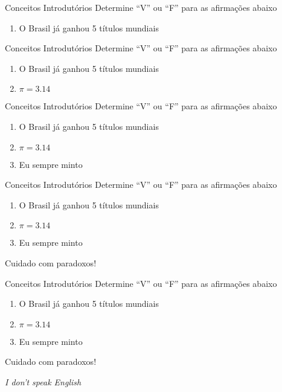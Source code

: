 \begin{frame}[t]{Conceitos Introdutórios} %
	Determine ``V'' ou ``F'' para as afirmações abaixo
	\begin{enumerate}
	  \item O Brasil já ganhou 5 títulos mundiais
	\end{enumerate}
\end{frame}

\begin{frame}[t]{Conceitos Introdutórios} %
	Determine ``V'' ou ``F'' para as afirmações abaixo
	\begin{enumerate}
	  \item O Brasil já ganhou 5 títulos mundiais
	  \item $\pi = 3.14$
	\end{enumerate}
\end{frame}

\begin{frame}[t]{Conceitos Introdutórios} %
	Determine ``V'' ou ``F'' para as afirmações abaixo
	\begin{enumerate}
	  \item O Brasil já ganhou 5 títulos mundiais
	  \item $\pi = 3.14$
	  \item Eu sempre minto
	\end{enumerate}
\end{frame}

\begin{frame}[t]{Conceitos Introdutórios} %
	Determine ``V'' ou ``F'' para as afirmações abaixo
	\begin{enumerate}
	  \item O Brasil já ganhou 5 títulos mundiais
	  \item $\pi = 3.14$
	  \item Eu sempre minto
	\end{enumerate}
	
	\vskip 1cm

	\begin{center}
	{\Huge {\sc Cuidado com paradoxos!}}
	\end{center}
\end{frame}

\begin{frame}[t]{Conceitos Introdutórios} %
	Determine ``V'' ou ``F'' para as afirmações abaixo
	\begin{enumerate}
	  \item O Brasil já ganhou 5 títulos mundiais
	  \item $\pi = 3.14$
	  \item Eu sempre minto
	\end{enumerate}
	
	\vskip 1cm

	\begin{center}
	{\Huge {\sc Cuidado com paradoxos!}} 

	\vskip 1cm

	{\it I don't speak English}

	\end{center}
\end{frame}


